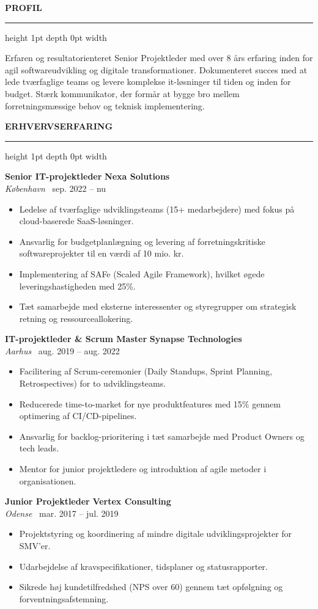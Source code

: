 \documentclass[10pt,a4paper]{article}
\newcommand{\cvsection}[1]{%
    \vspace{0.3cm}%
    {\color{primary}\large\bfseries\MakeUppercase{#1}}%
    \vspace{0.1cm}%
    \hrule height 1pt depth 0pt width \linewidth{\color{bordergray}}%
    \vspace{0.2cm}%
}
\newcommand{\cvitem}[4]{%
    \textbf{#1} \hfill {\color{secondary}\small\bfseries #2} \\{}%
    {\small\itshape #3} \hfill {\color{darktext}\scriptsize\faCalendar\ #4} \\{}%
    \vspace{0.05cm}%
}
\begin{document}
\begin{minipage}[t]{0.64\textwidth}
    \cvsection{Profil}
    Erfaren og resultatorienteret Senior Projektleder med over 8 års erfaring inden for agil softwareudvikling og digitale transformationer. Dokumenteret succes med at lede tværfaglige teams og levere komplekse it-løsninger til tiden og inden for budget. Stærk kommunikator, der formår at bygge bro mellem forretningsmæssige behov og teknisk implementering.

    \cvsection{Erhvervserfaring}
    
    \cvitem{Senior IT-projektleder}{Nexa Solutions}{København}{sep. 2022 -- nu}
    \begin{itemize}[leftmargin=*,nosep,label=\textcolor{secondary}{\tiny$\blacksquare$}]
        \item Ledelse af tværfaglige udviklingsteams (15+ medarbejdere) med fokus på cloud-baserede SaaS-løsninger.
        \item Ansvarlig for budgetplanlægning og levering af forretningskritiske softwareprojekter til en værdi af 10 mio. kr.
        \item Implementering af SAFe (Scaled Agile Framework), hvilket øgede leveringshastigheden med 25\%.
        \item Tæt samarbejde med eksterne interessenter og styregrupper om strategisk retning og ressourceallokering.
    \end{itemize}
    
    \vspace{0.25cm}
    \cvitem{IT-projektleder \& Scrum Master}{Synapse Technologies}{Aarhus}{aug. 2019 -- aug. 2022}
    \begin{itemize}[leftmargin=*,nosep,label=\textcolor{secondary}{\tiny$\blacksquare$}]
        \item Facilitering af Scrum-ceremonier (Daily Standups, Sprint Planning, Retrospectives) for to udviklingsteams.
        \item Reducerede time-to-market for nye produktfeatures med 15\% gennem optimering af CI/CD-pipelines.
        \item Ansvarlig for backlog-prioritering i tæt samarbejde med Product Owners og tech leads.
        \item Mentor for junior projektledere og introduktion af agile metoder i organisationen.
    \end{itemize}
    
    \vspace{0.25cm}
    \cvitem{Junior Projektleder}{Vertex Consulting}{Odense}{mar. 2017 -- jul. 2019}
    \begin{itemize}[leftmargin=*,nosep,label=\textcolor{secondary}{\tiny$\blacksquare$}]
        \item Projektstyring og koordinering af mindre digitale udviklingsprojekter for SMV'er.
        \item Udarbejdelse af kravspecifikationer, tidsplaner og statusrapporter.
        \item Sikrede høj kundetilfredshed (NPS over 60) gennem tæt opfølgning og forventningsafstemning.
    \end{itemize}


\end{minipage}
\end{document}

